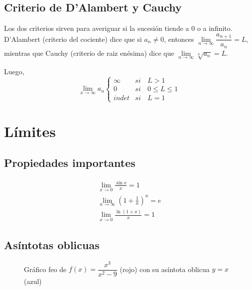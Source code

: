 \documentclass{article}
\begin{document}
\subsection{Criterio de D'Alambert y Cauchy}
Los dos criterios sirven para averiguar si la sucesión tiende a $0$ o a infinito.
D'Alambert (criterio del cociente) dice que si $a_n \neq 0$, entonces $\lim \limits_{n \to \infty} \dfrac{a_{n+1}}{a_n} = L$, mientras que Cauchy (criterio de raiz enésima) dice que $\displaystyle \lim \limits_{n \to \infty} \sqrt[n]{a_n} = L$.

Luego, 
\[
\lim \limits_{x \to \infty} a_n \left\{
\begin{array}{lcr}
    \infty & si & \,L>1 \\
     0 & si & \,0 \leq L \leq 1 \\
     indet & si & \,L=1
\end{array}
\right.
\]


\newpage
\section{Límites}
\subsection{Propiedades importantes}
\begin{align*}
    \lim \limits_{x \to 0} \frac{\sin x}{x} = 1 \\
    \lim \limits_{n \to \infty} \left(1+\frac{1}{n} \right)^n = e\\
    \lim \limits_{x \to 0} \frac{\ln (1+x)}{x} = 1 
\end{align*}


\subsection{Asíntotas oblicuas}
\begin{figure}[H]
    \centering
    \caption{Gráfico feo de $f(x)=\dfrac{x^3}{x^2-9}$ (rojo) con su asíntota oblicua $y=x$ (azul)}
    \label{fig:graph-1}
\end{figure}
\end{document}
